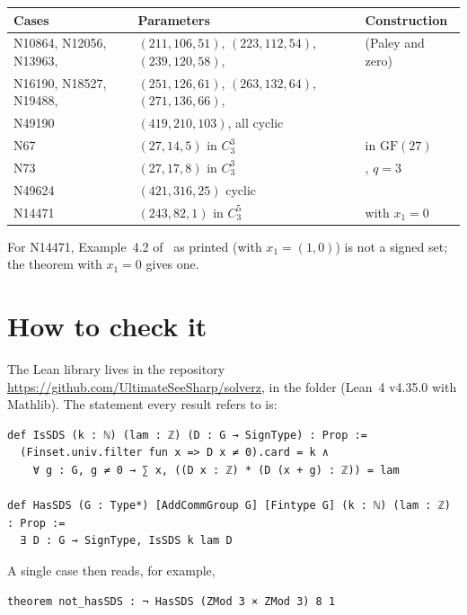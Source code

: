 \documentclass[11pt]{amsart}
\newcommand{\repo}{\url{https://github.com/UltimateSeeSharp/solverz}}
\begin{document}
\begin{center}\small
\begin{tabular}{@{}lll@{}}
\toprule
Cases & Parameters & Construction \\ \midrule
N10864, N12056, N13963, & $(211,106,51)$, $(223,112,54)$, $(239,120,58)$, & \cite[Prop.~2.3]{gordon}
  (Paley and zero) \\
N16190, N18527, N19488, & $(251,126,61)$, $(263,132,64)$, $(271,136,66)$, & \\
N49190 & $(419,210,103)$, all cyclic & \\
N67 & $(27,14,5)$ in $C_3^3$ & \cite[Prop.~2.3]{gordon} in $\mathrm{GF}(27)$ \\
N73 & $(27,17,8)$ in $C_3^3$ & \cite[Thm.~4.1]{gordon}, $q = 3$ \\
N49624 & $(421,316,25)$ cyclic & \cite[Prop.~5.5(2)]{he-chen-ge} \\
N14471 & $(243,82,1)$ in $C_3^5$ & \cite[Thm.~4.1]{he-chen-ge} with $x_1 = 0$ \\
\bottomrule
\end{tabular}
\end{center}

For N14471, Example~4.2 of~\cite{he-chen-ge} as printed (with $x_1 = (1,0)$) is not a signed
set; the theorem with $x_1 = 0$ gives one.

\section{How to check it}

The Lean library lives in the repository \repo, in the folder
 (Lean~4 v4.35.0 with Mathlib). The statement every
result refers to is:

\begin{Verbatim}[fontsize=\small]
def IsSDS (k : ℕ) (lam : ℤ) (D : G → SignType) : Prop :=
  (Finset.univ.filter fun x => D x ≠ 0).card = k ∧
    ∀ g : G, g ≠ 0 → ∑ x, ((D x : ℤ) * (D (x + g) : ℤ)) = lam

def HasSDS (G : Type*) [AddCommGroup G] [Fintype G] (k : ℕ) (lam : ℤ) : Prop :=
  ∃ D : G → SignType, IsSDS k lam D
\end{Verbatim}

\noindent A single case then reads, for example,

\begin{Verbatim}[fontsize=\small]
theorem not_hasSDS : ¬ HasSDS (ZMod 3 × ZMod 3) 8 1
\end{Verbatim}
\end{document}
